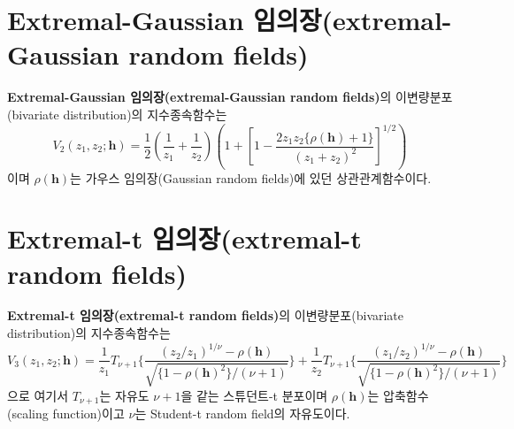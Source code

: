 \documentclass[b5paper,]{scrbook}
\theoremstyle{plain}
\theoremstyle{definition}
\numberwithin{equation}{section}
\begin{document}
\section{Extremal-Gaussian 임의장(extremal-Gaussian random
fields)}\label{extremal-gaussian-extremal-gaussian-random-fields}

\textbf{Extremal-Gaussian 임의장(extremal-Gaussian random fields)}의
이변량분포(bivariate distribution)의 지수종속함수는 \[
V_{2}(z_{1},z_{2};\mathbf{h})=\frac{1}{2}(\frac{1}{z_{1}}+\frac{1}{z_{2}})(1+[1-\frac{2z_{1}z_{2}\{\rho(\mathbf{h})+1\}}{(z_{1}+z_{2})^{2}}]^{1/2})
\] 이며 \(\rho(\mathbf{h})\)는 가우스 임의장(Gaussian random fields)에
있던 상관관계함수이다.

\section{Extremal-t 임의장(extremal-t random
fields)}\label{extremal-t-extremal-t-random-fields}

\textbf{Extremal-t 임의장(extremal-t random fields)}의
이변량분포(bivariate distribution)의 지수종속함수는 \[
V_{3}(z_{1},z_{2};\mathbf{h})=\frac{1}{z_{1}}T_{\nu+1}\{\frac{(z_{2}/z_{1})^{1/\nu}-\rho(\mathbf{h})}{\sqrt{\{ 1-\rho(\mathbf{h})^{2} \}/(\nu+1) }}\} + \frac{1}{z_{2}}T_{\nu+1}\{\frac{(z_{1}/z_{2})^{1/\nu}-\rho(\mathbf{h})}{\sqrt{\{ 1-\rho(\mathbf{h})^{2} \}/(\nu+1) }}\}
\] 으로 여기서 \(T_{\nu+1}\)는 자유도 \(\nu+1\)을 같는 스튜던트-t
분포이며 \(\rho(\mathbf{h})\)는 압축함수(scaling function)이고 \(\nu\)는
Student-t random field의 자유도이다.



\printindex
\end{document}
